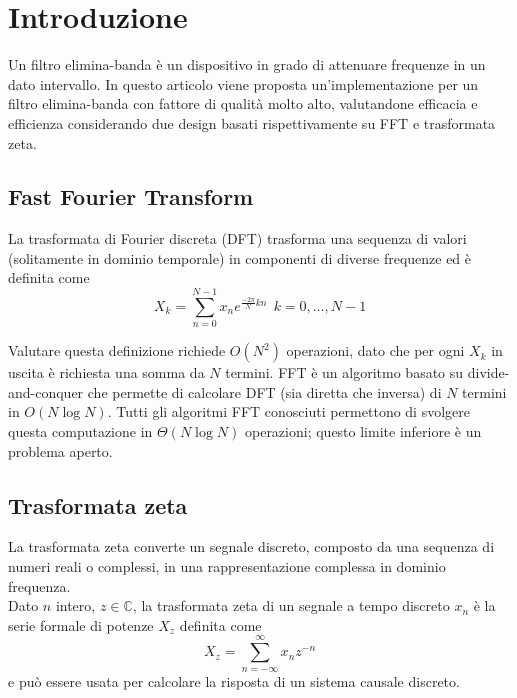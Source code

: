 \section{Introduzione}
Un filtro elimina-banda è un dispositivo in grado di attenuare frequenze in un dato intervallo.
In questo articolo viene proposta un'implementazione per un filtro elimina-banda con fattore di qualità molto alto,
valutandone efficacia e efficienza considerando due design basati rispettivamente su FFT e trasformata zeta.

\subsection{Fast Fourier Transform}
La trasformata di Fourier discreta (DFT) trasforma una sequenza di valori (solitamente in dominio temporale) in componenti di diverse frequenze ed è definita come
$$
X_k = \sum_{n = 0}^{N - 1}x_n e^{\frac{-2\pi}{N}kn} \ \ k = 0, \dots, N-1
$$

Valutare questa definizione richiede $O(N^2)$ operazioni, dato che per ogni $X_k$ in uscita è richiesta una somma da $N$ termini.
FFT è un algoritmo basato su divide-and-conquer che permette di calcolare DFT (sia diretta che inversa) di $N$ termini in $O(N \log N)$.
Tutti gli algoritmi FFT conosciuti permettono di svolgere questa computazione in $\Theta(N \log N)$ operazioni; questo limite inferiore è un problema aperto\cite{fftlimits}.

\subsection{Trasformata zeta}
La trasformata zeta converte un segnale discreto, composto da una sequenza di numeri reali o complessi, in una rappresentazione complessa in dominio frequenza.\\
Dato $n$ intero, $z \in \mathbb{C}$, la trasformata zeta di un segnale a tempo discreto $x_n$ è la serie formale di potenze $X_z$ definita come
$$
X_z = \sum_{n = -\infty}^{\infty}x_nz^{-n}
$$
e può essere usata per calcolare la risposta di un sistema causale discreto.

